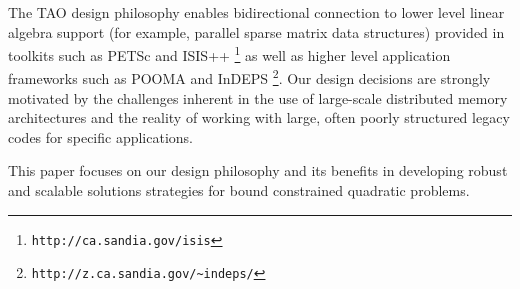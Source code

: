 The TAO design philosophy
enables bidirectional connection to lower level
linear algebra support (for example, parallel sparse matrix data
structures) provided in toolkits such as
PETSc \cite{petsc-efficient,petsc-manual}
and 
ISIS++%
\footnote{\texttt{http://ca.sandia.gov/isis}}
as well as higher level application frameworks such as 
POOMA \cite{pooma} and 
InDEPS%
\footnote{\texttt{http://z.ca.sandia.gov/\~{ }indeps/}}.
Our design decisions are strongly motivated by the challenges inherent
in the use of large-scale distributed memory architectures and the
reality of working with large, often
poorly structured legacy codes for specific applications.

This paper focuses on our design philosophy and its benefits in
developing robust
and scalable solutions strategies for bound
constrained quadratic problems.

